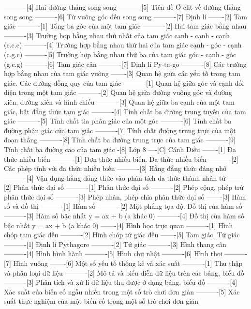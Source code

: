 ----------[4] Hai đường thẳng song song
----------[5] Tiên đề Ơ-clit về đường thẳng song song
----------[6] Từ vuông góc đến song song
----------[7] Định lí
-------[2] Tam giác
----------[1] Tổng ba góc của một tam giác
----------[2] Hai tam giác bằng nhau
----------[3] Trường hợp bằng nhau thứ nhất của tam giác cạnh - cạnh - cạnh (c.c.c)
----------[4] Trường hợp bằng nhau thứ hai của tam giác cạnh - góc - cạnh (c.g.c)
----------[5] Trường hợp bằng nhau thứ ba của tam giác góc - cạnh - góc (g.c.g)
----------[6] Tam giác cân
----------[7] Định lí Py-ta-go
----------[8] Các trường hợp bằng nhau của tam giác vuông
-------[3] Quan hệ giữa các yểu tố trong tam giác. Các đường đồng quy của tam giác
----------[1] Quan hệ giữa góc và cạnh đối diện trong một tam giác
----------[2] Quan hệ giữa đường vuông góc và đường xiên, đường xiên và hình chiếu
----------[3] Quan hệ giữa ba cạnh của một tam giác, bất đẳng thức tam giác
----------[4] Tính chất ba đường trung tuyến của tam giác
----------[5] Tính chất tia phân giác của một góc
----------[6] Tính chất ba đường phân giác của tam giác
----------[7] Tính chất đường trung trực của một đoạn thẳng
----------[8] Tính chất ba đường trung trực của tam giác
----------[9] Tính chất ba đường cao của tam giác
-[8] Lớp 8
----[C] Cánh Diều
-------[1] Đa thức nhiều biến
----------[1] Đơn thức nhiều biến. Đa thức nhiều biến
----------[2] Các phép tính với đa thức nhiều biến
----------[3] Hằng đẳng thức đáng nhớ
----------[4] Vận dụng hằng đẳng thức vào phân tích đa thức thành nhân tử
-------[2] Phân thức đại số
----------[1] Phân thức đại số
----------[2] Phép cộng, phép trừ phân thức đại số
----------[3] Phép nhân, phép chia phân thức đại số
-------[3] Hàm số và đồ thị
----------[1] Hàm số
----------[2] Mặt phẳng tọa độ. Đồ thị của hàm số
----------[3] Hàm số bậc nhất y = ax + b (a khác 0)
----------[4] Đồ thị của hàm số bậc nhất y = ax + b (a khác 0)
-------[4] Hình học trực quan
----------[1] Hình chóp tam giác đều
----------[2] Hình chóp tứ giác đều
-------[5] Tam giác. Tứ giác
----------[1] Định lí Pythagore
----------[2] Tứ giác
----------[3] Hình thang cân
----------[4] Hình bình hành
----------[5] Hình chữ nhật
----------[6] Hình thoi
----------[7] Hình vuông
-------[6] Một số yếu tố thống kê và xác suất
----------[1] Thu thập và phân loại dữ liệu
----------[2] Mô tả và biểu diễn dữ liệu trên các bảng, biểu đồ
----------[3] Phân tích và xử lí dữ liệu thu được ở dạng bảng, biểu đồ
----------[4] Xác suất của biến cố ngẫu nhiên trong một số trò chơi đơn giản
----------[5] Xác suất thực nghiệm của một biến cố trong một số trò chơi đơn giản

